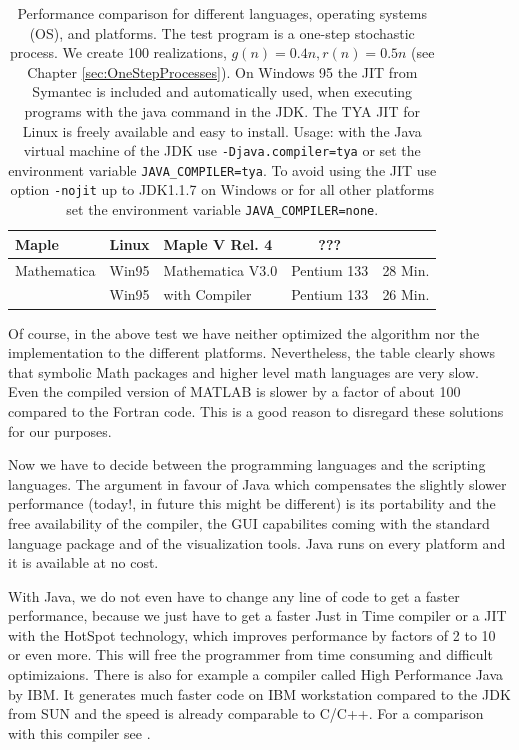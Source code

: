 \begin{table}[htbp]
\begin{center}
\begin{tabular}{llp{3cm}|c|c}
   Maple   & Linux & Maple V Rel. 4 & ??? & \\\hline
Mathematica& Win95 & Mathematica V3.0 & Pentium 133 & 28 Min. \\
\rowcolor{tabgray} & Win95 & with Compiler    & Pentium 133 & 26 Min. \\ \hline
    \end{tabular}
    \caption[Performance Table.]%
    {Performance comparison for different languages, operating
      systems (OS), and platforms.
      The test program is a one-step stochastic process. We create 100
      realizations, $g(n)=0.4n, r(n)=0.5n$ (see Chapter 
      \ref{sec:OneStepProcesses}).
      On Windows 95 the JIT from
      Symantec is included and automatically used, when executing programs
      with the java command in the JDK. The TYA JIT for Linux is freely
      available and easy to install. Usage: with the Java virtual machine of
      the JDK use \texttt{-Djava.compiler=tya} or 
      set the environment variable \texttt{JAVA\_COMPILER=tya}. To avoid
      using the JIT use option \texttt{-nojit} up to JDK1.1.7 on Windows or
      for all other platforms set the environment variable 
      \texttt{JAVA\_COMPILER=none}.
      }
    \label{tab:Performance}
  \end{center}
\end{table}


Of course, in the above test we have neither optimized the algorithm nor
the implementation to the 
different platforms. Nevertheless, the table clearly shows that 
symbolic Math packages and higher level math languages are 
very slow. Even the compiled version of MATLAB is slower by a factor of 
about 100 
compared to the Fortran code. This is a good reason to disregard 
these solutions for our purposes.

Now we have to decide between the programming languages and the scripting 
languages. The argument in favour of 
Java which compensates the slightly slower performance (today!, in future 
this might be different) is its portability and the free availability of the
compiler, the GUI capabilites coming with the standard language package
and of the visualization tools. Java runs on every platform and 
it is available at no cost. 

With Java, we do not even have to change any line
of code to get a faster performance, because we just have to get a faster
Just in Time compiler or a JIT with the HotSpot technology, which improves
performance by factors of 2 to 10 or even more. This will free the
programmer from time consuming and difficult optimizaions. 
There is also for example a compiler called High Performance Java by IBM. It generates
much faster code on IBM workstation compared to the JDK from SUN and the 
speed is already comparable to C/C++. 
For a comparison with this compiler see \cite[]{HPJ}.

